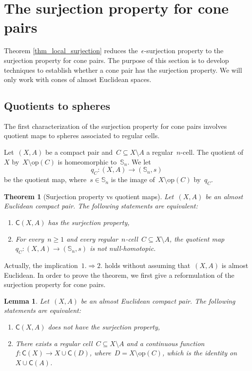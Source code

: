 \documentclass[english,11pt]{article}
\theoremstyle{plain}
\newtheorem{theorem}{Theorem}[section]
\newtheorem{lemma}{Lemma}[section]
\theoremstyle{remark}
\theoremstyle{definition}
\newcommand{\op}[1]{\mathrm{op}(#1)}
\newcommand{\Sp}{\mathbb{S}}
\newcommand{\C}[1]{\mathsf{C}(#1)}%
\begin{document}
\section{The surjection property for cone pairs}\label{sec_cones}
Theorem \ref{thm_local_surjection} reduces the~$\epsilon$-surjection property to the surjection property for cone pairs. The purpose of this section is to develop techniques to establish whether a cone pair has the surjection property. We will only work with cones of almost Euclidean spaces.


\subsection{Quotients to spheres}
The first characterization of the surjection property for cone pairs involves quotient maps to spheres associated to regular cells.

Let~$(X,A)$ be a compact pair and~$C\subseteq X\setminus A$ a regular~$n$-cell. The quotient of~$X$ by~$X\setminus \op{C}$ is homeomorphic to~$\Sp_n$. We let
\begin{equation}
q_C:(X,A)\to (\Sp_n,s)
\end{equation}
be the quotient map, where~$s\in\Sp_n$ is the image of~$X\setminus \op{C}$ by~$q_C$.
\begin{theorem}[Surjection property vs quotient maps]\label{thm_surj_prop_cone}
Let~$(X,A)$ be an almost Euclidean compact pair. The following statements are equivalent:
\begin{enumerate}
\item $\C{X,A}$ has the surjection property,
\item For every~$n\geq 1$ and every regular~$n$-cell~$C\subseteq X\setminus A$, the quotient map~$q_C:(X,A)\to (\Sp_n,s)$ is not null-homotopic.
\end{enumerate}
\end{theorem}

Actually, the implication~$1.\Rightarrow 2.$ holds without assuming that~$(X,A)$ is almost Euclidean. In order to prove the theorem, we first give a reformulation of the surjection property for cone pairs.
\begin{lemma}\label{lem_surj_prop_cone}
Let~$(X,A)$ be an almost Euclidean compact pair. The following statements are equivalent:
\begin{enumerate}
\item $\C{X,A}$ does not have the surjection property,
\item There exists a regular cell~$C\subseteq X\setminus A$ and a continuous function~$f:\C X\to X\cup \C D$, where~$D=X\setminus \op{C}$, which is the identity on~$X\cup\C{A}$.
\end{enumerate}
\end{lemma}
\end{document}
